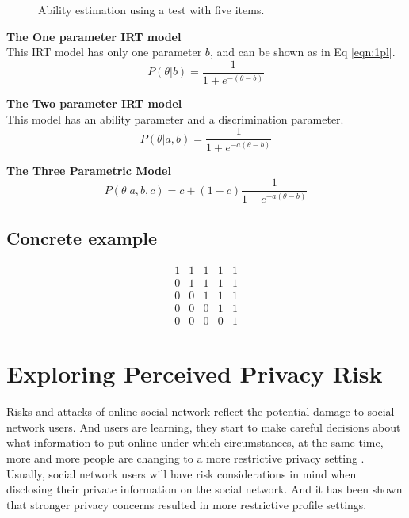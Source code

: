 \documentclass[a4paper]{article}
\begin{document}
\begin{enumerate}
\begin{figure}
            \caption{Ability estimation using a test with five items.}
            \label{fig:predict-ability}
        \end{figure}
\end{enumerate}

\textbf{The One parameter IRT model} \\
This IRT model has only one parameter $b$, and can be shown as in Eq \ref{eqn:1pl}.
\begin{equation}
    P(\theta|b) = \frac{1}{1+e^{-(\theta - b)}}
    \label{eqn:1pl}
\end{equation}

\textbf{The Two parameter IRT model}\\
This model has an ability parameter and a discrimination parameter. 
\begin{equation}
    P(\theta|a,b) = \frac{1}{1+e^{-a(\theta - b)}}
    \label{eqn:2pl}
\end{equation}

\textbf{The Three Parametric Model} \\ 
\begin{equation}
    P(\theta|a,b,c) = c + (1-c)\frac{1}{1+e^{-a(\theta - b)}}
    \label{eqn:3pl}
\end{equation}

\subsection{Concrete example}
\[\begin{array}{ccccc}
  1 & 1 & 1 & 1 & 1 \\
  0 & 1 & 1 & 1 & 1 \\
  0 & 0 & 1 & 1 & 1 \\
  0 & 0 & 0 & 1 & 1 \\
  0 & 0 & 0 & 0 & 1 
\end{array}
\]
\section{Exploring Perceived Privacy Risk}
Risks and attacks of online social network reflect the potential
damage to social network users. And users are learning, they start to
make careful decisions about what information to put online under
which circumstances, at the same time, more and more people are
changing to a more restrictive privacy setting \cite{socialnet:setting}.
Usually, social network users will have risk considerations in
mind when disclosing their private information
on the social network. And it has been shown
\cite{privacy:paradox:revisit} that stronger privacy
concerns resulted in more restrictive profile settings.
\end{document}
